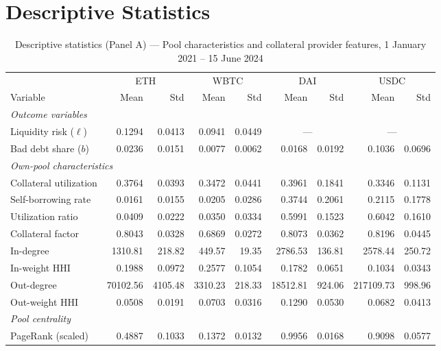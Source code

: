 \documentclass[a4paper,UKenglish,cleveref, autoref, thm-restate]{informs3}
\begin{document}
\section{Descriptive Statistics}
\FloatBarrier 
\begin{table}[H]
\centering
\begin{threeparttable}
\caption{Descriptive statistics (Panel A) ---
         Pool characteristics and collateral provider features,
         1 January 2021 -- 15 June 2024}
\label{tab:desc_stats_a}
\footnotesize
\begin{tabular}{lrrrrrrrr}
\toprule
& \multicolumn{2}{c}{ETH} & \multicolumn{2}{c}{WBTC}
& \multicolumn{2}{c}{DAI} & \multicolumn{2}{c}{USDC} \\
\cmidrule(lr){2-3}\cmidrule(lr){4-5}
\cmidrule(lr){6-7}\cmidrule(lr){8-9}
Variable & Mean & Std & Mean & Std & Mean & Std & Mean & Std \\
\midrule
\multicolumn{9}{l}{\textit{Outcome variables}} \\
Liquidity risk ($\ell$) & 0.1294 & 0.0413 & 0.0941 & 0.0449 & \multicolumn{2}{c}{---} & \multicolumn{2}{c}{---} \\
Bad debt share ($b$) & 0.0236 & 0.0151 & 0.0077 & 0.0062 & 0.0168 & 0.0192 & 0.1036 & 0.0696 \\
\midrule
\multicolumn{9}{l}{\textit{Own-pool characteristics}} \\
Collateral utilization & 0.3764 & 0.0393 & 0.3472 & 0.0441 & 0.3961 & 0.1841 & 0.3346 & 0.1131 \\
Self-borrowing rate & 0.0161 & 0.0155 & 0.0205 & 0.0286 & 0.3744 & 0.2061 & 0.2115 & 0.1778 \\
Utilization ratio & 0.0409 & 0.0222 & 0.0350 & 0.0334 & 0.5991 & 0.1523 & 0.6042 & 0.1610 \\
Collateral factor & 0.8043 & 0.0328 & 0.6869 & 0.0272 & 0.8073 & 0.0362 & 0.8196 & 0.0445 \\
In-degree & 1310.81 & 218.82 & 449.57 & 19.35 & 2786.53 & 136.81 & 2578.44 & 250.72 \\
In-weight HHI & 0.1988 & 0.0972 & 0.2577 & 0.1054 & 0.1782 & 0.0651 & 0.1034 & 0.0343 \\
Out-degree & 70102.56 & 4105.48 & 3310.23 & 218.33 & 18512.81 & 924.06 & 217109.73 & 998.96 \\
Out-weight HHI & 0.0508 & 0.0191 & 0.0703 & 0.0316 & 0.1290 & 0.0530 & 0.0682 & 0.0413 \\
\midrule
\multicolumn{9}{l}{\textit{Pool centrality}} \\
PageRank (scaled) & 0.4887 & 0.1033 & 0.1372 & 0.0132 & 0.9956 & 0.0168 & 0.9098 & 0.0577 \\

\end{tabular}
\end{threeparttable}
\end{table}
\end{document}
